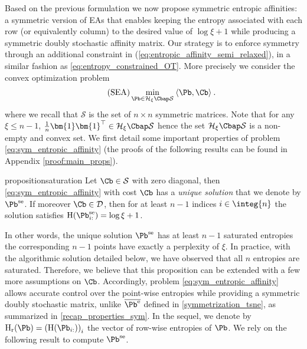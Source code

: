 Based on the previous formulation we now propose symmetric entropic affinities: a symmetric version of EAs that enables keeping the entropy associated with each row (or equivalently column) to the desired value of $\log \xi + 1$ while producing a symmetric doubly stochastic affinity matrix. Our strategy is to enforce symmetry through an additional constraint in (\ref{eq:entropic_affinity_semi_relaxed}), in a similar fashion as \eqref{eq:entropy_constrained_OT}. More precisely we consider the convex optimization problem
\begin{align}
\label{eq:sym_entropic_affinity}
\tag{SEA}
  \min_{\Pb \in \mathcal{H}_{\xi} \Cbap \mathcal{S}} \: \langle \Pb, \Cb \rangle \:. 
\end{align}
where we recall that $\mathcal{S}$ is the set of $n \times n$ symmetric matrices. Note that for any $\xi \leq n-1$, $\frac{1}{n} \bm{1}\bm{1}^\top \in \mathcal{H}_{\xi} \Cbap \mathcal{S}$ hence the set $\mathcal{H}_{\xi} \Cbap \mathcal{S}$ is a non-empty and convex set. We first detail some important properties of problem \eqref{eq:sym_entropic_affinity} (the proofs of the following results can be found in Appendix \ref{proof:main_props}).
\begin{restatable}{proposition}{saturation}
\label{prop:saturation_entropies}
Let $\Cb \in \mathcal{S}$ with zero diagonal, then \eqref{eq:sym_entropic_affinity} with cost $\Cb$ has a \emph{unique solution} that we denote by $\Pb^{\mathrm{se}}$. If moreover $\Cb \in \mathcal{D}$, then for at least $n-1$ indices $i \in \integ{n}$ the solution satisfies $\operatorname{H}(\Pb^{\mathrm{se}}_{i:}) = \log \xi + 1$.
\end{restatable}
In other words, the unique solution $\Pb^{\mathrm{se}}$ has at least $n-1$ saturated entropies \ie the corresponding $n-1$ points have exactly a perplexity of $\xi$. In practice, with the algorithmic solution detailed below, we have observed that all $n$ entropies are saturated. Therefore, we believe that this proposition can be extended with a few more assumptions on $\Cb$. Accordingly,
problem \eqref{eq:sym_entropic_affinity} allows accurate control over the point-wise entropies while providing a symmetric doubly stochastic matrix, unlike $\overline{\Pb^{\mathrm{e}}}$ defined in
\eqref{symmetrization_tsne}, as summarized in \cref{recap_properties_sym}. In the sequel, we denote by $\operatorname{H}_{\mathrm{r}}(\Pb) = \left( \operatorname{H}(\Pb_{i:}) \right)_{i}$ the vector of row-wise entropies of $\Pb$. We rely on the following result to compute $\Pb^{\mathrm{se}}$.
